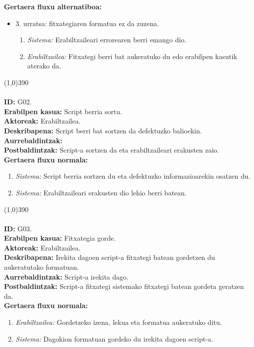 \textbf{Gertaera fluxu alternatiboa:}
\begin{itemize}
	\item 3. urratsa: fitxategiaren formatua ez da zuzena.
		\begin{enumerate}
		\item \textit{Sistema:} Erabiltzaileari errorearen berri emango dio.
		\item \textit{Erabiltzailea:} Fitxategi berri bat aukeratuko du edo erabilpen kasutik aterako da.
		\end{enumerate}
\end{itemize}
\line(1,0){390}\\
\noindent\\
\textbf{ID:} G02.\\
\textbf{Erabilpen kasua:} Script berria sortu.\\
\textbf{Aktoreak:} Erabiltzailea.\\
\textbf{Deskribapena:} Script berri bat sortzen da defektuzko balioekin.\\
\textbf{Aurrebaldintzak:}\\
\textbf{Postbaldintzak:} Script-a sortzen da eta erabiltzaileari erakusten zaio.\\
\textbf{Gertaera fluxu normala:}
\begin{enumerate}
	\item \textit{Sistema:} Script berria sortzen du eta defektuzko informazioarekin osatzen du.
	\item \textit{Sistema:} Erabiltzaileari erakusten dio lehio berri batean.
\end{enumerate}
\line(1,0){390}\\
\noindent\\
\textbf{ID:} G03.\\
\textbf{Erabilpen kasua:} Fitxategia gorde.\\
\textbf{Aktoreak:} Erabiltzailea.\\
\textbf{Deskribapena:} Irekita dagoen script-a fitxategi batean gordetzen du aukeratutako formatuan.\\
\textbf{Aurrebaldintzak:} Script-a irekita dago.\\
\textbf{Postbaldintzak:} Script-a fitxategi sistemako fitxategi batean gordeta geratzen da.\\
\textbf{Gertaera fluxu normala:}
\begin{enumerate}
	\item \textit{Erabiltzailea:} Gordetzeko izena, lekua eta formatua aukeratuko ditu.
	\item \textit{Sistema:} Dagokion formatuan gordeko du irekita dagoen script-a.
\end{enumerate}
